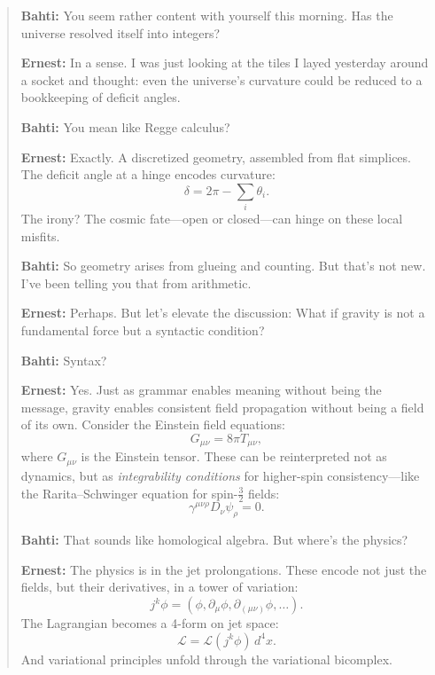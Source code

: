\begin{quote}
\textbf{Bahti:} You seem rather content with yourself this morning. Has the universe resolved itself into integers?

\textbf{Ernest:} In a sense. I was just looking at the tiles I layed yesterday around a socket and thought: even the universe's curvature could be reduced to a bookkeeping of deficit angles.

\textbf{Bahti:} You mean like Regge calculus?

\textbf{Ernest:} Exactly. A discretized geometry, assembled from flat simplices. The deficit angle at a hinge encodes curvature:
\[
\delta = 2\pi - \sum_i \theta_i.
\]
The irony? The cosmic fate---open or closed---can hinge on these local misfits.

\textbf{Bahti:} So geometry arises from glueing and counting. But that\textquoteright s not new. I\textquoteright ve been telling you that from arithmetic.

\textbf{Ernest:} Perhaps. But let\textquoteright s elevate the discussion: What if gravity is not a fundamental force but a syntactic condition?

\textbf{Bahti:} Syntax?

\textbf{Ernest:} Yes. Just as grammar enables meaning without being the message, gravity enables consistent field propagation without being a field of its own. Consider the Einstein field equations:
\begin{equation}
G_{\mu\nu} = 8\pi T_{\mu\nu},
\end{equation}
where \(G_{\mu\nu}\) is the Einstein tensor. These can be reinterpreted not as dynamics, but as \emph{integrability conditions} for higher-spin consistency---like the Rarita--Schwinger equation for spin-$\tfrac{3}{2}$ fields:
\begin{equation}
\gamma^{\mu\nu\rho} D_\nu \psi_\rho = 0.
\end{equation}

\textbf{Bahti:} That sounds like homological algebra. But where's the physics?

\textbf{Ernest:} The physics is in the jet prolongations. These encode not just the fields, but their derivatives, in a tower of variation:
\[
j^k\phi = (\phi, \partial_\mu\phi, \partial_{(\mu\nu)}\phi, \dots).
\]
The Lagrangian becomes a 4-form on jet space:
\begin{equation}
\mathcal{L} = \mathcal{L}(j^k\phi) \, d^4x.
\end{equation}
And variational principles unfold through the variational bicomplex.


\end{quote}
